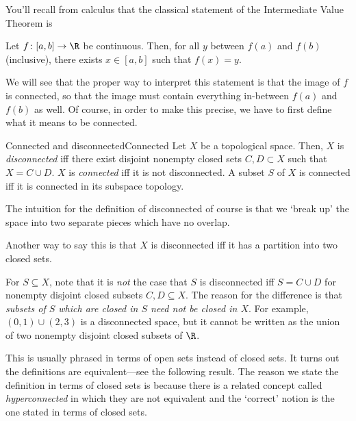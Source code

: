 You'll recall from calculus that the classical statement of the Intermediate Value Theorem is
\begin{textequation}
Let $f\colon [a,b]\rightarrow \R$ be continuous.  Then, for all $y$ between $f(a)$ and $f(b)$ (inclusive), there exists $x\in [a,b]$ such that $f(x)=y$.
\end{textequation}
We will see that the proper way to interpret this statement is that the image of $f$ is connected, so that the image must contain everything in-between $f(a)$ and $f(b)$ as well.  Of course, in order to make this precise, we have to first define what it means to be connected.
\begin{dfn}{Connected and disconnected}{Connected}
Let $X$ be a topological space.  Then, $X$ is \emph{disconnected} iff there exist disjoint nonempty closed sets $C,D\subset X$ such that $X=C\cup D$.  $X$ is \emph{connected} iff it is not disconnected.  A subset $S$ of $X$ is connected iff it is connected in its subspace topology.
\begin{rmk}
The intuition for the definition of disconnected of course is that we `break up' the space into two separate pieces which have no overlap.
\end{rmk}
\begin{rmk}
Another way to say this is that $X$ is disconnected iff it has a partition into two closed sets.
\end{rmk}
\begin{rmk}
For $S\subseteq X$, note that it is \emph{not} the case that $S$ is disconnected iff $S=C\cup D$ for nonempty disjoint closed subsets $C,D\subseteq X$.  The reason for the difference is that \emph{subsets of $S$ which are closed in $S$ need not be closed in $X$}.  For example, $(0,1)\cup (2,3)$ is a disconnected space, but it cannot be written as the union of two nonempty disjoint closed subsets of $\R$.
\end{rmk}
\begin{rmk}
This is usually phrased in terms of open sets instead of closed sets.  It turns out the definitions are equivalent---see the following result.  The reason we state the definition in terms of closed sets is because there is a related concept called \emph{hyperconnected} in which they are not equivalent and the `correct' notion is the one stated in terms of closed sets.
\end{rmk}
\end{dfn}
